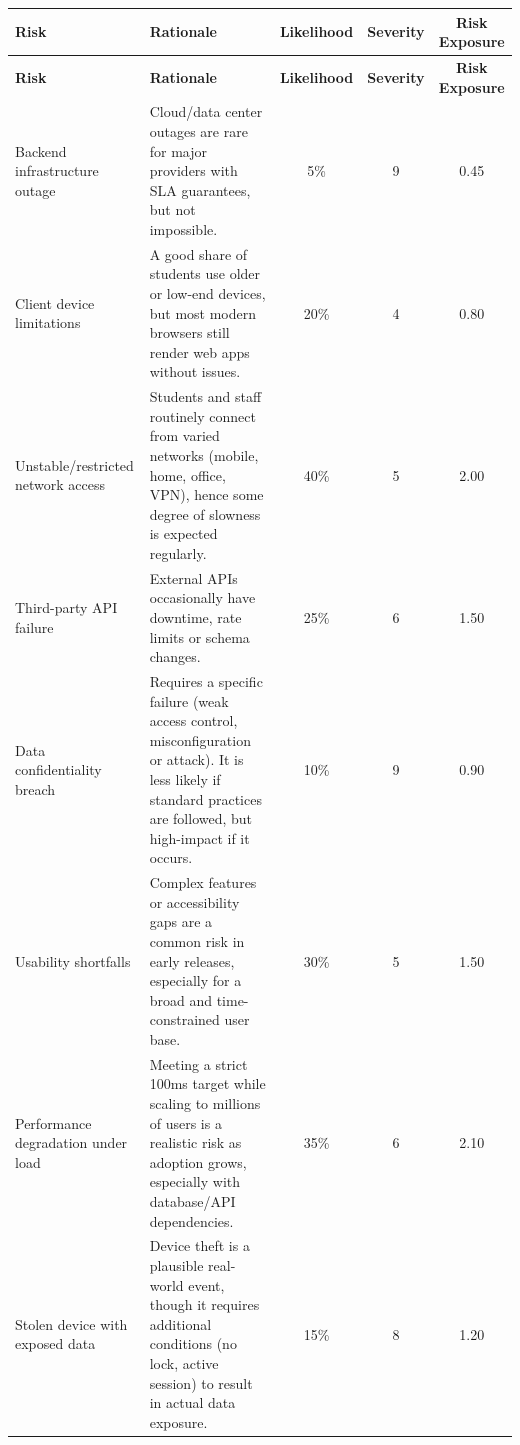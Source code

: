 \documentclass[11pt]{article}
\begin{document}
\begin{longtable}{|p{2.8cm}|p{4.5cm}|c|c|c|}
\hline
\textbf{Risk} & \textbf{Rationale} & \textbf{Likelihood} & \textbf{Severity} & \textbf{Risk Exposure} \\
\hline
\endfirsthead

\hline
\textbf{Risk} & \textbf{Rationale} & \textbf{Likelihood} & \textbf{Severity} & \textbf{Risk Exposure} \\
\hline
\endhead

\hline
\endfoot

\hline
\endlastfoot

Backend infrastructure outage & Cloud/data center outages are rare for major providers with SLA guarantees, but not impossible. & 5\% & 9 & 0.45 \\
\hline

Client device limitations & A good share of students use older or low-end devices, but most modern browsers still render web apps without issues. & 20\% & 4 & 0.80 \\
\hline

Unstable/restricted network access & Students and staff routinely connect from varied networks (mobile, home, office, VPN), hence some degree of slowness is expected regularly. & 40\% & 5 & 2.00 \\
\hline

Third-party API failure & External APIs occasionally have downtime, rate limits or schema changes. & 25\% & 6 & 1.50 \\
\hline

Data confidentiality breach & Requires a specific failure (weak access control, misconfiguration or attack). It is less likely if standard practices are followed, but high-impact if it occurs. & 10\% & 9 & 0.90 \\
\hline

Usability shortfalls & Complex features or accessibility gaps are a common risk in early releases, especially for a broad and time-constrained user base. & 30\% & 5 & 1.50 \\
\hline

Performance degradation under load & Meeting a strict 100ms target while scaling to millions of users is a realistic risk as adoption grows, especially with database/API dependencies. & 35\% & 6 & 2.10 \\
\hline

Stolen device with exposed data & Device theft is a plausible real-world event, though it requires additional conditions (no lock, active session) to result in actual data exposure. & 15\% & 8 & 1.20 \\
\hline

\end{longtable}
\end{document}

